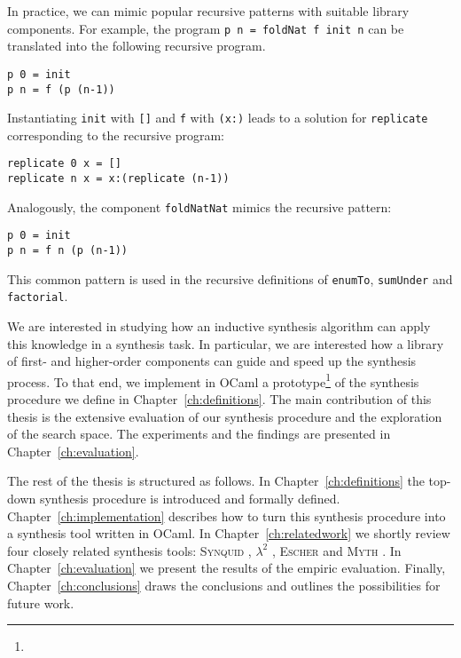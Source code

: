 In practice, we can mimic popular recursive patterns with suitable library components. For example, the program \lstinline!p n = foldNat f init n! can be translated into the following recursive program.
\begin{lstlisting}[style=plain]
p 0 = init
p n = f (p (n-1))
\end{lstlisting}
Instantiating \lstinline!init! with \lstinline![]! and \lstinline!f! with \lstinline!(x:)! leads to a solution for \lstinline!replicate! corresponding to the recursive program:
\begin{lstlisting}[style=plain]
replicate 0 x = []
replicate n x = x:(replicate (n-1))
\end{lstlisting}

Analogously, the component \lstinline!foldNatNat! mimics the recursive pattern:
\begin{lstlisting}[style=plain]
p 0 = init
p n = f n (p (n-1))
\end{lstlisting}
This common pattern is used in the recursive definitions of \lstinline!enumTo!, \lstinline!sumUnder! and \lstinline!factorial!.

We are interested in studying how an inductive synthesis algorithm can apply this knowledge in a synthesis task. In particular, we are interested how a library of first- and higher-order components can guide and speed up the synthesis process.
To that end, we implement in OCaml a prototype\footnote{} of the synthesis procedure we define in Chapter~\ref{ch:definitions}. The main contribution of this thesis is the extensive evaluation of our synthesis procedure and the exploration of the search space. The experiments and the findings are presented in Chapter~\ref{ch:evaluation}.

The rest of the thesis is structured as follows. In Chapter~\ref{ch:definitions} the top-down synthesis procedure is introduced and formally defined. Chapter~\ref{ch:implementation} describes how to turn this synthesis procedure into a synthesis tool written in OCaml. In Chapter~\ref{ch:relatedwork} we shortly review four closely related synthesis tools: \textsc{Synquid} \cite{SynquidPaper}, $\lambda^2$ \cite{LambdaSquarePaper}, \textsc{Escher} \cite{EscherPaper} and \textsc{Myth} \cite{MythPaper}. In Chapter~\ref{ch:evaluation} we present the results of the empiric evaluation. Finally, Chapter~\ref{ch:conclusions} draws the conclusions and outlines the possibilities for future work.
